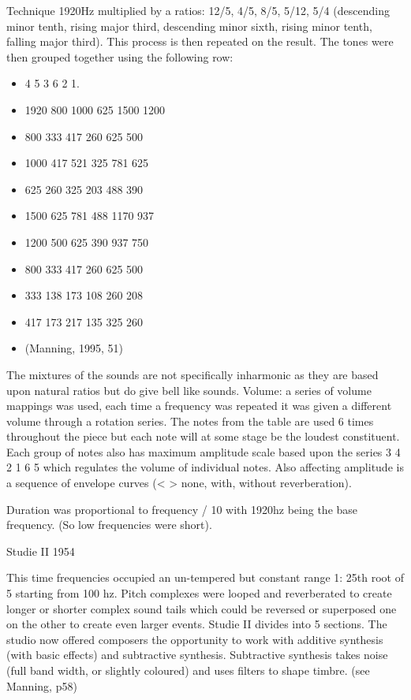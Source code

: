 Technique
1920Hz multiplied by a ratios: 12/5, 4/5, 8/5, 5/12, 5/4 (descending minor tenth, rising major third, descending minor sixth, rising minor tenth, falling major third). This process is then repeated on the result. The tones were then grouped together using the following row:
\begin{itemize}
\item 4 5 3 6 2 1.
\item 1920 800 1000 625 1500 1200
\item 800 333 417 260 625 500
\item 1000 417 521 325 781 625
\item 625 260 325 203 488 390
\item 1500 625 781 488 1170 937
\item 1200 500 625 390 937 750
\item 800 333 417 260 625 500
\item 333 138 173 108 260 208
\item 417 173 217 135 325 260
\item (Manning, 1995, 51)
\end{itemize}

The mixtures of the sounds are not specifically inharmonic as they are based upon natural ratios but do give bell like sounds. Volume: a series of volume mappings was used, each time a frequency was repeated it was given a different volume through a rotation series.
The notes from the table are used 6 times throughout the piece but each note will at some stage be the loudest constituent. Each group of notes also has maximum amplitude scale based upon the series 3 4 2 1 6 5 which regulates the volume of individual notes. Also
affecting amplitude is a sequence of envelope curves (< > none, with, without reverberation).

Duration was proportional to frequency / 10 with 1920hz being the base frequency. (So low frequencies were short).

Studie II 1954

This time frequencies occupied an un-tempered but constant range 1: 25th root of 5 starting from 100 hz. Pitch complexes were looped and reverberated to create longer or shorter complex sound tails which could be reversed or superposed one on the other to
create even larger events. Studie II divides into 5 sections. The studio now offered composers the opportunity to work with additive synthesis (with basic effects) and subtractive synthesis. Subtractive synthesis takes noise (full band width, or slightly
coloured) and uses filters to shape timbre. (see Manning, p58)

